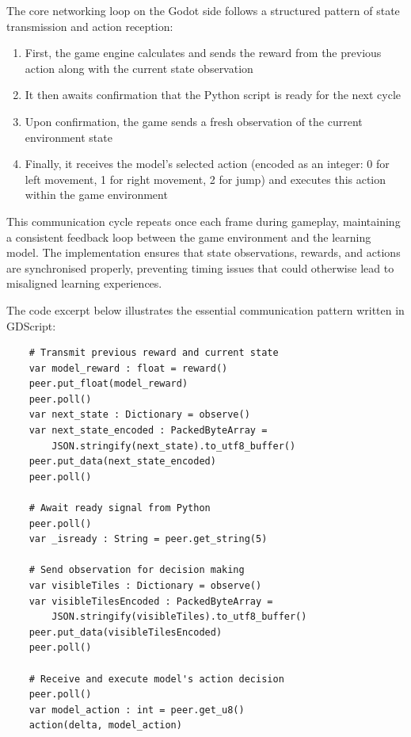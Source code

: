 The core networking loop on the Godot side follows a structured pattern of state transmission and action reception:

\begin{enumerate}
    \item First, the game engine calculates and sends the reward from the previous action along with the current state observation
    \item It then awaits confirmation that the Python script is ready for the next cycle
    \item Upon confirmation, the game sends a fresh observation of the current environment state
    \item Finally, it receives the model's selected action (encoded as an integer: 0 for left movement, 1 for right movement, 2 for jump) and executes this action within the game environment
\end{enumerate}

This communication cycle repeats once each frame during gameplay, maintaining a consistent feedback loop between the game environment and the learning model. 
The implementation ensures that state observations, rewards, and actions are synchronised properly, preventing timing issues that could otherwise lead to misaligned learning experiences.

The code excerpt below illustrates the essential communication pattern written in GDScript:

\singlespaced
\begin{verbatim}
    # Transmit previous reward and current state
    var model_reward : float = reward()
    peer.put_float(model_reward)
    peer.poll()
    var next_state : Dictionary = observe()
    var next_state_encoded : PackedByteArray = 
        JSON.stringify(next_state).to_utf8_buffer()
    peer.put_data(next_state_encoded)
    peer.poll()

    # Await ready signal from Python
    peer.poll()
    var _isready : String = peer.get_string(5)

    # Send observation for decision making
    var visibleTiles : Dictionary = observe()
    var visibleTilesEncoded : PackedByteArray = 
        JSON.stringify(visibleTiles).to_utf8_buffer()
    peer.put_data(visibleTilesEncoded)
    peer.poll()

    # Receive and execute model's action decision
    peer.poll()
    var model_action : int = peer.get_u8()
    action(delta, model_action)
\end{verbatim}
\doublespaced

